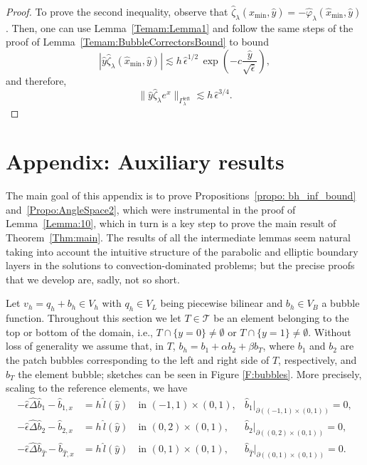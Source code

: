 \documentclass{article}
\newcommand{\T}{\ensuremath{\mathcal{T}}\xspace}
\newcommand{\Gammaleft}{\ensuremath{\Gamma_\lambda^{\text{left}}}\xspace}
\newcommand{\hatT}{\ensuremath{{\hat{T}}}}
\newcommand{\hatb}{\ensuremath{\hat{b}}}
\begin{document}
\begin{appendix}
\begin{proof}
To prove the second inequality, observe that $\hat{\zeta}_\lambda(\hat x_{\min},\hat{y}) = -\hat{\varphi}_\lambda(\hat x_{\min},\hat{y})$. Then, one can use Lemma~\ref{Temam:Lemma1} and follow the same steps of the proof of Lemma~\ref{Temam:BubbleCorrectorsBound} %
 to bound
$$
|\hat{y}\hat{\zeta}_\lambda(\hat x_{\min},\hat{y})| \lesssim  h\,\hat{\epsilon}^{1/2}\, \exp(-c\frac{\hat{y}}{\sqrt{\hat{\epsilon}}}),
$$
and therefore, 
$$
\|\hat{y}\hat{\zeta}_\lambda e^x\|_{\Gammaleft} \lesssim  h\,\hat{\epsilon}^{3/4}.
$$
\end{proof}




\section{Appendix: Auxiliary results}
\label{Appendix:aux}

The main goal of this appendix is to prove Propositions~\ref{propo: bh_inf_bound} and~\ref{Propo:AngleSpace2}, which were instrumental in the proof of Lemma~\ref{Lemma:10}, which in turn is a key step to prove the main result of Theorem~\ref{Thm:main}. The results of all the intermediate lemmas seem natural taking into account the intuitive structure of the parabolic and elliptic boundary layers in the solutions to convection-dominated problems; but the precise proofs that we develop are, sadly, not so short.

Let ${v_h = q_h + b_h}\in V_h$ with $q_h \in V_L$ being piecewise bilinear and $b_h \in V_B$  a bubble function. 
Throughout this section we let $T\in \T$ be an element belonging to the top or bottom of the domain, i.e., $T\cap \{y=0\} \neq \emptyset$ or $T\cap \{y=1\} \neq \emptyset$. Without loss of generality we assume that, in $T$, $b_h= b_1 + \alpha b_2 + \beta b_T$, where $b_1$ and $b_2$ are the patch bubbles corresponding to the left and right side of $T$, respectively, and $b_T$ the element bubble; sketches can be seen in Figure \ref{F:bubbles}. More precisely, scaling to the reference elements, we have
\begin{align*}
-\hat{\epsilon} \hat{\Delta} \hat{b}_1 - \hat{b}_{1,x} &= h \,\hat l(\hat{y}) 
\quad\text{in }(-1,1)\times (0,1), & \hat{b}_1|_{\partial((-1,1)\times (0,1))}=0 ,
\\
-\hat{\epsilon} \hat{\Delta} \hat{b}_2 - \hat{b}_{2,x} &= h \,\hat l(\hat{y}) 
\quad\text{in }(0,2)\times (0,1), & \hat{b}_2|_{\partial((0,2)\times (0,1))}=0 ,
\\
-\hat{\epsilon} \hat{\Delta} \hat{b}_{\hat{T}} - \hat{b}_{\hat{T},x} &= h \,\hat l(\hat{y}) 
\quad\text{in }(0,1)\times (0,1), & \hatb_\hatT|_{\partial((0,1)\times (0,1))}=0 .
\end{align*}


\end{appendix}
\end{document}
